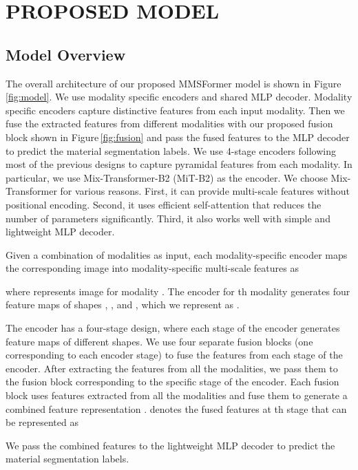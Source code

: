 \documentclass{article}
\begin{document}
\section{PROPOSED MODEL}
\label{sec:proposed-model}

\subsection{Model Overview}
The overall architecture of our proposed MMSFormer model is shown in Figure\,\ref{fig:model}. We use modality specific encoders and shared MLP decoder. Modality specific encoders capture distinctive features from each input modality. Then we fuse the extracted features from different modalities with our proposed fusion block shown in Figure\,\ref{fig:fusion} and pass the fused features to the MLP decoder to predict the material segmentation labels. We use 4-stage encoders following most of the previous designs  \cite{wang2021pvt, xie2021segformer, chen2018deeplabv3+} to capture pyramidal features from each modality. In particular, we use Mix-Transformer-B2 (MiT-B2) \cite{xie2021segformer} as the encoder. We choose Mix-Transformer for various reasons. First, it can provide multi-scale features without positional encoding. Second, it uses efficient self-attention that reduces the number of parameters significantly. Third, it also works well with simple and lightweight MLP decoder.

Given a combination of modalities as input, each modality-specific encoder maps the corresponding image into modality-specific multi-scale features as

where  represents image for modality . The encoder for th modality generates four feature maps of shapes , ,  and , which we represent as .  

The encoder has a four-stage design, where each stage of the encoder generates feature maps of different shapes. We use four separate fusion blocks (one corresponding to each encoder stage) to fuse the features from each stage of the encoder. After extracting the features  from all the modalities, we pass them to the fusion block corresponding to the specific stage of the encoder. 
Each fusion block uses features extracted from all the modalities and fuse them to generate a combined feature representation .  denotes the fused features at th stage that can be represented as 

We pass the combined features  to the lightweight MLP decoder \cite{xie2021segformer} to predict the material segmentation labels. 
\end{document}
